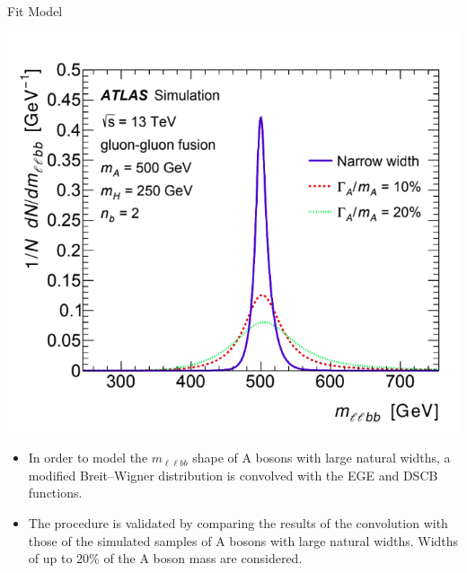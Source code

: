 \documentclass[10pt]{beamer} %
\begin{document}
\begin{frame}{Fit Model}
    \begin{minipage}[b]{0.49\linewidth}
        \centering
        \includegraphics[width=1.0\textwidth]{Figs/model.png}
    \end{minipage}
        \hfill
    \begin{minipage}[b]{0.49\linewidth}
        \begin{itemize}
            \item         In order to model the $m_{\ell\ell bb}$ shape of A bosons with large natural widths, a modified Breit–Wigner distribution is convolved with the EGE and DSCB functions.
            \item The procedure is validated by comparing the results of the convolution with those of the simulated samples of A bosons with large natural widths. Widths of up to
20\% of the A boson mass are considered.
        \end{itemize}

    \end{minipage}

    
\end{frame}
\end{document}
